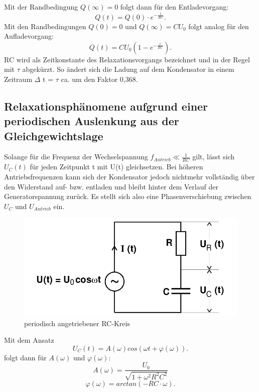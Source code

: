 Mit der Randbedingung $ Q(\infty)=0$ folgt dann für den Entladevorgang:
\begin{equation}
  Q(t) = Q(0) \cdot e^{-\frac{t}{RC}}\text{.}
\end{equation}
Mit den Randbedingungen $Q(0) = 0 $ und $Q(\infty) = CU_0$ folgt analog für
den Aufladevorgang:
\begin{equation}
  Q(t) = CU_0 \left(1-e^{-\frac{t}{RC}}\right)\text{.}
\end{equation}
RC wird als Zeitkonstante des Relaxationsvorgangs bezeichnet und in der Regel mit
 $\tau$ abgekürzt. So ändert sich die Ladung auf dem Kondensator in einem Zeitraum
 $\Delta$ t = $\tau$ ca. um den Faktor 0,368.

 \subsection{Relaxationsphänomene aufgrund einer periodischen Auslenkung aus der Gleichgewichtslage}

 Solange für die Frequenz der Wechselspannung $ f_{Antrieb} \ll \frac{1}{RC} $ gilt, lässt sich
 $U_C(t)$ für jeden Zeitpunkt t mit U(t) gleichsetzen. Bei höheren Antriebsfrequenzen
 kann sich der Kondensator jedoch nichtmehr vollständig über den Widerstand
  auf- bzw. entladen und bleibt hinter dem Verlauf der Generatorspannung zurück.
  Es stellt sich also eine Phasenverschiebung zwischen $U_C$ und $U_{Antrieb}$ ein.

\begin{figure}[H]
  \centering

  \includegraphics[width=\linewidth-200pt,height=\textheight-200pt,keepaspectratio]{content/RC_Kreis2.png}
  \caption{periodisch angetriebener RC-Kreis}
  \label{fig:RC_Kreis2}
\end{figure}

  Mit dem Ansatz
  \begin{equation}
  U_C(t) = A(\omega)cos(\omega t+\varphi(\omega))\text{.}
  \end{equation}
  folgt dann für $A(\omega)$ und $\varphi(\omega)$:
  \begin{equation}
    A(\omega) = \frac{U_0}{\sqrt{1+\omega^2R^2C^2}}
  \end{equation}
  \begin{equation}
    \varphi(\omega) = arctan(-RC \cdot \omega)\text{.}
  \end{equation}

